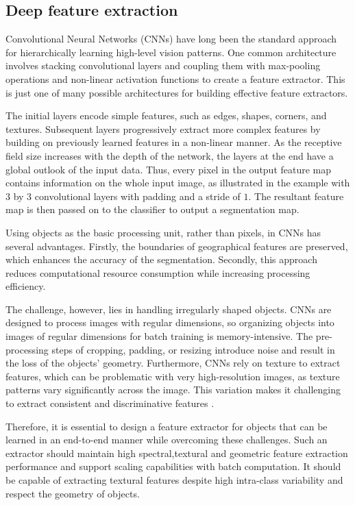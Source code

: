 \subsection{Deep feature extraction}
Convolutional Neural Networks (CNNs) have long been the standard approach for hierarchically learning high-level vision patterns. One common architecture involves stacking convolutional layers and coupling them with max-pooling operations and non-linear activation functions to create a feature extractor. This is just one of many possible architectures for building effective feature extractors.

The initial layers encode simple features, such as edges, shapes, corners, and textures. Subsequent layers progressively extract more complex features by building on previously learned features in a non-linear manner. As the receptive field size increases with the depth of the network, the layers at the end have a global outlook of the input data\cite{chen_adaptive_2020}. Thus, every pixel in the output feature map contains information on the whole input image, as illustrated in the example with \(3\) by \(3\) convolutional layers with padding and a stride of \(1\). The resultant feature map is then  passed on to the classifier to output a segmentation map.

Using objects as the basic processing unit, rather than pixels, in CNNs has several advantages. Firstly, the boundaries of geographical features are preserved, which enhances the accuracy of the segmentation. Secondly, this approach reduces computational resource consumption while increasing processing efficiency\cite{lu_object-based_2024}.

The challenge, however, lies in handling irregularly shaped objects. CNNs are designed to process images with regular dimensions, so organizing objects into images of regular dimensions for batch training is memory-intensive. The pre-processing steps of cropping, padding, or resizing introduce noise and result in the loss of the objects' geometry. Furthermore, CNNs rely on texture to extract features, which can be problematic with very high-resolution images, as texture patterns vary significantly across the image. This variation makes it challenging to extract consistent and discriminative features \cite{audebert_how_2016}.

Therefore, it is essential to design a feature extractor for objects that can be learned in an end-to-end manner while overcoming these challenges. Such an extractor should maintain high spectral,textural and geometric feature extraction performance and support scaling capabilities with batch computation. It should be capable of extracting textural features despite high intra-class variability and respect the geometry of objects. 

